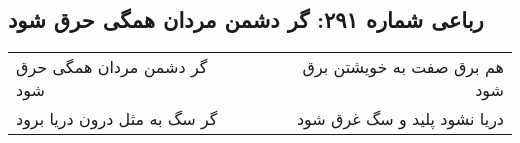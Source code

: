 \begin{center}
\section*{رباعی شماره ۲۹۱: گر دشمن مردان همگی حرق شود}
\label{sec:sh291}
\begin{longtable}{l p{0.5cm} r}
گر دشمن مردان همگی حرق شود
&&
هم برق صفت به خویشتن برق شود
\\
گر سگ به مثل درون دریا برود
&&
دریا نشود پلید و سگ غرق شود
\\
\end{longtable}
\end{center}
